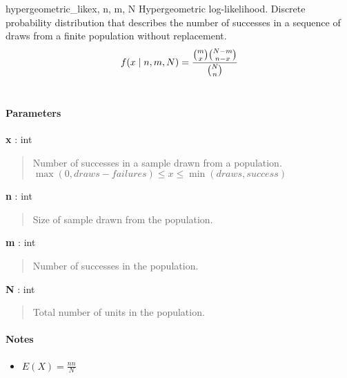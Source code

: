 \hypertarget{pymc.distributions.hypergeometric_like}{}
\begin{funcdesc}{hypergeometric\_like}{x, n, m, N}
Hypergeometric log-likelihood. Discrete probability distribution that
describes the number of successes in a sequence of draws from a finite
population without replacement.
\begin{gather}
\begin{split}f(x \mid n, m, N) = \frac{\binom{m}{x}\binom{N-m}{n-x}}{\binom{N}{n}}\end{split}\notag\\\begin{split}\end{split}\notag
\end{gather}
\paragraph{Parameters}
\begin{paramlist}
\item[] \textbf{x} : int
\begin{quote}
Number of successes in a sample drawn from a population.
$\max(0, draws-failures) \leq x \leq \min(draws, success)$
\end{quote}
\item[] \textbf{n} : int
\begin{quote}
Size of sample drawn from the population.
\end{quote}
\item[] \textbf{m} : int
\begin{quote}
Number of successes in the population.
\end{quote}
\item[] \textbf{N} : int
\begin{quote}
Total number of units in the population.
\end{quote}
\end{paramlist}
\paragraph{Notes}
\begin{itemize}
\item $E(X) = \frac{n n}{N}$
\end{itemize}
\end{funcdesc}

